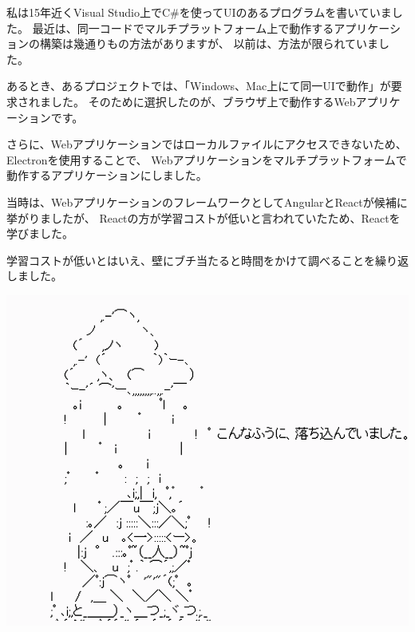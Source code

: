 私は15年近くVisual Studio上でC\#を使ってUIのあるプログラムを書いていました。
最近は、同一コードでマルチプラットフォーム上で動作するアプリケーションの構築は幾通りもの方法がありますが、
以前は、方法が限られていました。

\vspace*{\baselineskip}

あるとき、あるプロジェクトでは、「Windows、Mac上にて同一UIで動作」が要求されました。
そのために選択したのが、ブラウザ上で動作するWebアプリケーションです。

\vspace*{\baselineskip}

さらに、Webアプリケーションではローカルファイルにアクセスできないため、Electronを使用することで、
Webアプリケーションをマルチプラットフォームで動作するアプリケーションにしました。

\vspace*{\baselineskip}

当時は、WebアプリケーションのフレームワークとしてAngularとReactが候補に挙がりましたが、
Reactの方が学習コストが低いと言われていたため、Reactを学びました。

学習コストが低いとはいえ、壁にブチ当たると時間をかけて調べることを繰り返しました。

\begin{reviewimage}[H]%
\includegraphics[width=0.7\maxwidth]{./images/00-preface/greetings02.png}%
\label{image:00-preface:greetings02}
\end{reviewimage}
\vspace*{\baselineskip}

